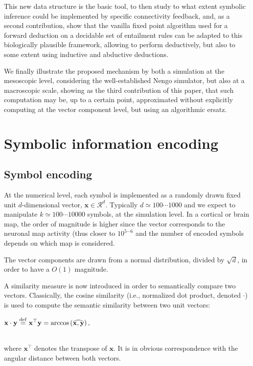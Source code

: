 \documentclass[sn-mathphys]{sn-jnl}
\newcommand{\defq}{\stackrel {\rm def}{=}}
\newcommand{\eqline}[1]{~\vspace{0.1cm}\\\centerline{$#1$}\vspace{0.1cm}\\}
\begin{document}
This new data structure is the basic tool, to then study to what extent symbolic inference could be implemented by specific connectivity feedback, and, as a second contribution, show that the vanilla fixed point algorithm used for a forward deduction on a decidable set of entailment rules can be adapted to this biologically plausible framework, allowing to perform deductively, but also to some extent using inductive and abductive deductions.

We finally illustrate the proposed mechanism by both a simulation at the mesoscopic level, considering the well-established Nengo simulator, but also at a macroscopic scale, showing as the third contribution of this paper, that such computation may be, up to a certain point, approximated without explicitly computing at the vector component level, but using an algorithmic ersatz.

\section{Symbolic information encoding} \label{encoding}

\subsection{Symbol encoding}

At the numerical level, each symbol is implemented as a randomly drawn fixed unit $d$-dimensional vector, $\mathbf{x} \in {\mathcal R}^d$. Typically $d\simeq 100 \cdots 1000$ and we expect to manipulate $k\simeq 100 \cdots 10000$ symbols, at the simulation level. In a cortical or brain map, the order of magnitude is higher since the vector corresponds to the neuronal map activity (thus closer to $10^{5\cdots 6}$ and the number of encoded symbols depends on which map is considered.

The vector components are drawn from a normal distribution, divided by $\sqrt{d}$, in order to have a $O(1)$ magnitude.

A similarity measure is now introduced in order to semantically compare two vectors. Classically, the cosine similarity (i.e., normalized dot product, denoted $\cdot$) is used to compute the semantic similarity between two unit vectors:
\eqline{\mathbf{x} \cdot \mathbf{y} \defq \mathbf{x}^\top \mathbf{y} = \mbox{arccos}\left(\widehat{\mathbf{x}, \mathbf{y}}\right),}
where $\mathbf{x}^\top$ denotes the transpose of $\mathbf{x}$.  It is in obvious correspondence with the angular distance between both vectors.
\end{document}
